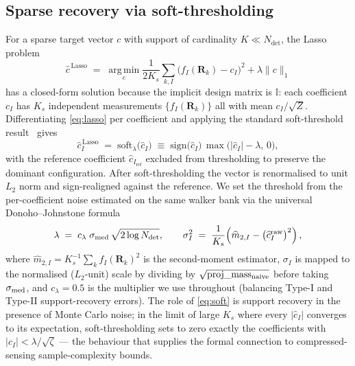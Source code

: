 \documentclass[journal=jctcce,manuscript=article,layout=traditional]{achemso}
\begin{document}
\subsection{Sparse recovery via soft-thresholding}
\label{sec:cs_lasso}

For a sparse target vector $c$ with support of cardinality
$K \ll N_{\mathrm{det}}$, the Lasso problem
\begin{equation}
\widehat{c}^{\,\text{Lasso}} \;=\;
\operatorname*{arg\,min}_{c}
\frac{1}{2 K_s} \sum_{k,I}\bigl( f_I(\mathbf{R}_k) - c_I \bigr)^2
+ \lambda \|c\|_1
\label{eq:lasso}
\end{equation}
has a closed-form solution because the implicit design matrix is
$\mathbb{I}$: each coefficient $c_I$ has $K_s$ independent measurements
$\{f_I(\mathbf{R}_k)\}$ all with mean $c_I/\sqrt{Z}$. Differentiating
\eqref{eq:lasso} per coefficient and applying the standard
soft-threshold result~\cite{Tibshirani1996lasso} gives
\begin{equation}
\widehat{c}_I^{\,\text{Lasso}}
\;=\;
\mathrm{soft}_{\lambda}\!\bigl(\widehat{c}_I\bigr)
\;\equiv\;
\mathrm{sign}\bigl(\widehat{c}_I\bigr)\,
\max\!\bigl(|\widehat{c}_I| - \lambda,\, 0\bigr),
\label{eq:soft}
\end{equation}
with the reference coefficient $\widehat{c}_{I_{\text{ref}}}$ excluded
from thresholding to preserve the dominant configuration. After
soft-thresholding the vector is renormalised to unit $L_2$ norm and
sign-realigned against the reference. We set the threshold from the
per-coefficient noise estimated on the same walker bank via the
universal Donoho--Johnstone formula
\begin{equation}
\lambda \;=\; c_\lambda\; \sigma_{\rm med}\,\sqrt{2 \log N_{\rm det}},
\qquad
\sigma_I^2 \;=\;
\frac{1}{K_s}\!\left(\widehat{m}_{2,I} - \bigl(\widehat{c}_I^{\rm raw}\bigr)^{2}\right),
\label{eq:lambda_universal}
\end{equation}
where $\widehat{m}_{2,I} = K_s^{-1}\sum_k f_I(\mathbf{R}_k)^2$ is the
second-moment estimator, $\sigma_I$ is mapped to the normalised
($L_2$-unit) scale by dividing by $\sqrt{\text{proj}\_\text{mass}_{\rm
naive}}$ before taking $\sigma_{\rm med}$, and $c_\lambda = 0.5$ is
the multiplier we use throughout (balancing Type-I and Type-II
support-recovery errors). The role of \eqref{eq:soft} is support
recovery in the presence of Monte Carlo noise; in the limit of large
$K_s$ where every $|\widehat{c}_I|$ converges to its expectation,
soft-thresholding sets to zero exactly the coefficients with
$|c_I| < \lambda / \sqrt{\zeta}$ --- the behaviour that supplies the
formal connection to compressed-sensing sample-complexity bounds.
\end{document}
